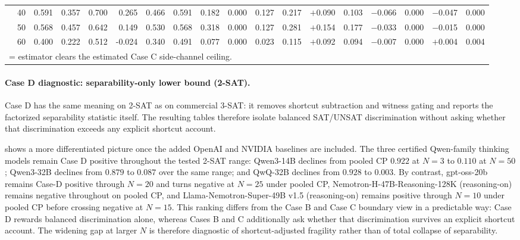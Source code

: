 \documentclass[conference]{IEEEtran}
\theoremstyle{remark}
\begin{document}
\begin{table}[ht]
{\begin{tabular}{p{2.2cm}r rrrr rr rr rr rr rr rr}
  & 40 & 0.591 & 0.357 & 0.700 & 0.265 & 0.466 & 0.591 & 0.182 & 0.000 & 0.127 & 0.217 & \cellcolor{green!15}$+$0.090 & \cellcolor{green!15}0.103 & $-$0.066 & 0.000 & $-$0.047 & 0.000 \\
  & 50 & 0.568 & 0.457 & 0.642 & 0.149 & 0.530 & 0.568 & 0.318 & 0.000 & 0.127 & 0.281 & \cellcolor{green!15}$+$0.154 & \cellcolor{green!15}0.177 & $-$0.033 & 0.000 & $-$0.015 & 0.000 \\
  & 60 & 0.400 & 0.222 & 0.512 & -0.024 & 0.340 & 0.491 & 0.077 & 0.000 & 0.023 & 0.115 & \cellcolor{green!15}$+$0.092 & \cellcolor{green!15}0.094 & $-$0.007 & 0.000 & \cellcolor{green!15}$+$0.004 & \cellcolor{green!15}0.004 \\
\bottomrule
\multicolumn{18}{l}{\colorbox{green!15}{\phantom{X}} = estimator clears the estimated Case C side-channel ceiling.}
\end{tabular}%
}
\end{table}

\paragraph{Case D diagnostic: separability-only lower bound (2-SAT).}
Case D has the same meaning on 2-SAT as on commercial 3-SAT: it removes shortcut subtraction and witness gating and reports the factorized separability statistic itself.  The resulting tables therefore isolate balanced SAT/UNSAT discrimination without asking whether that discrimination exceeds any explicit shortcut account.

 shows a more differentiated picture once the added OpenAI and NVIDIA baselines are included.  The three certified Qwen-family thinking models remain Case D positive throughout the tested 2-SAT range: Qwen3-14B declines from pooled CP $0.922$ at $N=3$ to $0.110$ at $N=50$; Qwen3-32B declines from $0.879$ to $0.087$ over the same range; and QwQ-32B declines from $0.928$ to $0.003$.
By contrast, gpt-oss-20b remains Case-D positive through $N=20$ and turns negative at $N=25$ under pooled CP, Nemotron-H-47B-Reasoning-128K (reasoning-on) remains negative throughout on pooled CP, and Llama-Nemotron-Super-49B v1.5 (reasoning-on) remains positive through $N=10$ under pooled CP before crossing negative at $N=15$.
This ranking differs from the Case B and Case C boundary view in a predictable way: Case D rewards balanced discrimination alone, whereas Cases B and C additionally ask whether that discrimination survives an explicit shortcut account.  The widening gap at larger $N$ is therefore diagnostic of shortcut-adjusted fragility rather than of total collapse of separability.
\end{document}
